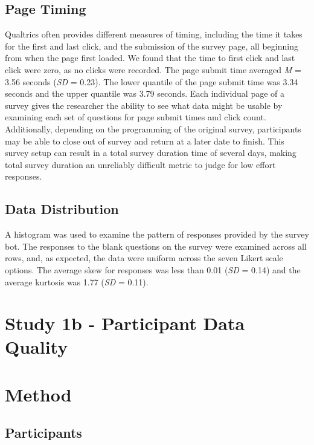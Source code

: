 \documentclass[english,man]{apa6}
\theoremstyle{definition}
\theoremstyle{definition}
\theoremstyle{definition}
\theoremstyle{remark}
\begin{document}
\subsection{Page Timing}\label{page-timing}

Qualtrics often provides different measures of timing, including the
time it takes for the first and last click, and the submission of the
survey page, all beginning from when the page first loaded. We found
that the time to first click and last click were zero, as no clicks were
recorded. The page submit time averaged \emph{M} = 3.56 seconds
(\emph{SD} = 0.23). The lower quantile of the page submit time was 3.34
seconds and the upper quantile was 3.79 seconds. Each individual page of
a survey gives the researcher the ability to see what data might be
usable by examining each set of questions for page submit times and
click count. Additionally, depending on the programming of the original
survey, participants may be able to close out of survey and return at a
later date to finish. This survey setup can result in a total survey
duration time of several days, making total survey duration an
unreliably difficult metric to judge for low effort responses.

\subsection{Data Distribution}\label{data-distribution}

A histogram was used to examine the pattern of responses provided by the
survey bot. The responses to the blank questions on the survey were
examined across all rows, and, as expected, the data were uniform across
the seven Likert scale options. The average skew for responses was less
than 0.01 (\emph{SD} = 0.14) and the average kurtosis was 1.77
(\emph{SD} = 0.11).

\section{Study 1b - Participant Data
Quality}\label{study-1b---participant-data-quality}

\section{Method}\label{method-1}

\subsection{Participants}\label{participants}
\end{document}
